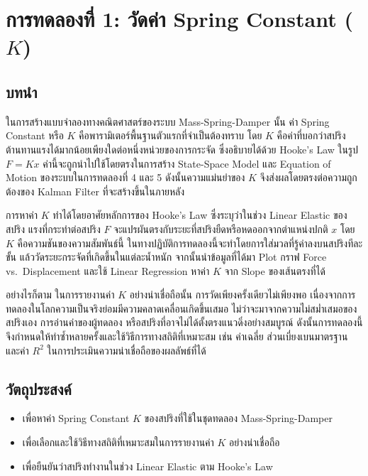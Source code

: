
\section{การทดลองที่ 1: วัดค่า Spring Constant (\texorpdfstring{$K$}{K})}

\subsection{บทนำ}

ในการสร้างแบบจำลองทางคณิตศาสตร์ของระบบ Mass-Spring-Damper นั้น ค่า Spring Constant หรือ $K$ คือพารามิเตอร์พื้นฐานตัวแรกที่จำเป็นต้องทราบ โดย $K$ คือค่าที่บอกว่าสปริงต้านทานแรงได้มากน้อยเพียงใดต่อหนึ่งหน่วยของการกระจัด ซึ่งอธิบายได้ด้วย Hooke's Law ในรูป $F = Kx$ ค่านี้จะถูกนำไปใช้โดยตรงในการสร้าง State-Space Model และ Equation of Motion ของระบบในการทดลองที่ 4 และ 5 ดังนั้นความแม่นยำของ $K$ จึงส่งผลโดยตรงต่อความถูกต้องของ Kalman Filter ที่จะสร้างขึ้นในภายหลัง

การหาค่า $K$ ทำได้โดยอาศัยหลักการของ Hooke's Law ซึ่งระบุว่าในช่วง Linear Elastic ของสปริง แรงที่กระทำต่อสปริง $F$ จะแปรผันตรงกับระยะที่สปริงยืดหรือหดออกจากตำแหน่งปกติ $x$ โดย $K$ คือความชันของความสัมพันธ์นี้ ในทางปฏิบัติการทดลองนี้จะทำโดยการใส่มวลที่รู้ค่าลงบนสปริงทีละขั้น แล้ววัดระยะกระจัดที่เกิดขึ้นในแต่ละน้ำหนัก จากนั้นนำข้อมูลที่ได้มา Plot กราฟ Force vs.\ Displacement และใช้ Linear Regression หาค่า $K$ จาก Slope ของเส้นตรงที่ได้

อย่างไรก็ตาม ในการรายงานค่า $K$ อย่างน่าเชื่อถือนั้น การวัดเพียงครั้งเดียวไม่เพียงพอ เนื่องจากการทดลองในโลกความเป็นจริงย่อมมีความคลาดเคลื่อนเกิดขึ้นเสมอ ไม่ว่าจะมาจากความไม่สม่ำเสมอของสปริงเอง การอ่านค่าของผู้ทดลอง หรือสปริงที่อาจไม่ได้ตั้งตรงแนวดิ่งอย่างสมบูรณ์ ดังนั้นการทดลองนี้จึงกำหนดให้ทำซ้ำหลายครั้งและใช้วิธีการทางสถิติที่เหมาะสม เช่น ค่าเฉลี่ย ส่วนเบี่ยงเบนมาตรฐาน และค่า $R^2$ ในการประเมินความน่าเชื่อถือของผลลัพธ์ที่ได้

\subsection{วัตถุประสงค์}
\begin{itemize}
    \item เพื่อหาค่า Spring Constant $K$ ของสปริงที่ใช้ในชุดทดลอง Mass-Spring-Damper
    \item เพื่อเลือกและใช้วิธีทางสถิติที่เหมาะสมในการรายงานค่า $K$ อย่างน่าเชื่อถือ
    \item เพื่อยืนยันว่าสปริงทำงานในช่วง Linear Elastic ตาม Hooke's Law
\end{itemize}

